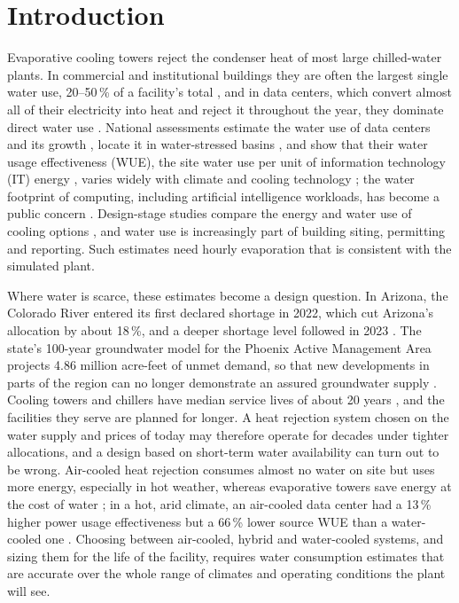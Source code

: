 \documentclass[preprint,12pt]{elsarticle}
\begin{document}
\section{Introduction}\label{sec:intro}
Evaporative cooling towers reject the condenser heat of most large chilled-water plants. In commercial and
institutional buildings they are often the largest single water use, 20--50\,\% of a facility's total
\citep{epa2012watersense}, and in data centers, which convert almost all of their electricity into heat and reject it
throughout the year, they dominate direct water use \citep{mytton2021data,shehabi2016united}. National assessments
estimate the water use of data centers and its growth \citep{shehabi2024united}, locate it in water-stressed basins
\citep{siddik2021environmental}, and show that their water usage effectiveness (WUE), the site water use per unit of
information technology (IT) energy \citep{greengrid2011wue}, varies widely with climate and cooling technology
\citep{lei2022climate}; the water footprint of computing, including artificial intelligence workloads, has become a
public concern \citep{ristic2015water,li2025making}. Design-stage studies compare the energy and water use of cooling
options \citep{karimi2022water,karimi2025energy}, and water use is increasingly part of building siting, permitting and
reporting. Such estimates need hourly evaporation that is consistent with the simulated plant.

Where water is scarce, these estimates become a design question. In Arizona, the Colorado River entered its first declared shortage in 2022, which cut Arizona's
allocation by about 18\,\%, and a deeper shortage level followed in 2023 \citep{reclamation2021reclamation,
reclamation2022interior}. The state's 100-year groundwater model for the Phoenix Active Management Area projects 4.86
million acre-feet of unmet demand, so that new developments in parts of the region can no longer demonstrate an assured
groundwater supply \citep{azgovernor2023governor,kylcenter2023new}. Cooling towers and chillers have median service
lives of about 20 years \citep{ashrae2015owning}, and the facilities they serve are planned for longer. A heat
rejection system chosen on the water supply and prices of today may therefore operate for decades under tighter
allocations, and a design based on short-term water availability can turn out to be wrong. Air-cooled heat rejection
consumes almost no water on site but uses more energy, especially in hot weather, whereas evaporative towers save energy
at the cost of water \citep{vangeet2024best,karimi2022water,karimi2025energy}; in a hot, arid climate, an air-cooled data
center had a 13\,\% higher power usage effectiveness but a 66\,\% lower source WUE than a water-cooled one
\citep{karimi2022water}. Choosing between air-cooled, hybrid and water-cooled systems, and sizing them for the life of
the facility, requires water consumption estimates that are accurate over the whole range of climates and operating
conditions the plant will see.
\end{document}
